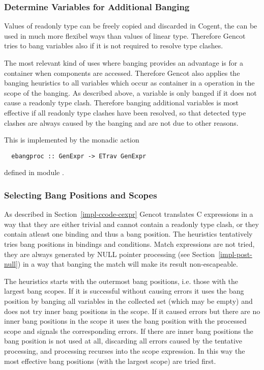 \subsubsection{Determine Variables for Additional Banging}

Values of readonly type can be freely copied and discarded in Cogent, the can be used in much more flexibel ways than
values of linear type. Therefore Gencot tries to bang variables also if it is not required to resolve type clashes.

The most relevant kind of uses where banging provides an advantage is for a container when components are accessed.
Therefore Gencot also applies the banging heuristics to all variables which occur as container in a 
operation in the scope of the banging. As described above, a variable is only banged if it does not cause a readonly type
clash. Therefore banging additional variables is most effective if all readonly type clashes have been resolved, so
that detected type clashes are always caused by the banging and are not due to other reasons.

This is implemented by the monadic action
\begin{verbatim}
  ebangproc :: GenExpr -> ETrav GenExpr
\end{verbatim}
defined in module .

\subsubsection{Selecting Bang Positions and Scopes}

As described in Section~\ref{impl-ccode-cexpr} Gencot translates C expressions in a way that they are either trivial and cannot
contain a readonly type clash, or they contain atleast one binding and thus a bang position. The heuristics tentatively tries
bang positions in bindings and conditions. Match expressions are not tried, they are always generated by NULL pointer processing
(see Section~\ref{impl-post-null}) in a way that banging the match will make its result non-escapeable.

The heuristics starts with the outermost bang positions, i.e. those with the largest bang scopes. If it is successful without
causing errors it uses the bang position by banging all variables in the collected set (which may be empty) and does not try
inner bang positions in the scope. If it caused errors but there are no inner bang positions in the scope it uses the bang
position with the processed scope and signals the corresponding errors. If there are inner bang positions the bang position
is not used at all, discarding all errors caused by the tentative processing, and processing recurses into the scope expression.
In this way the most effective bang positions (with the largest scope) are tried first.

